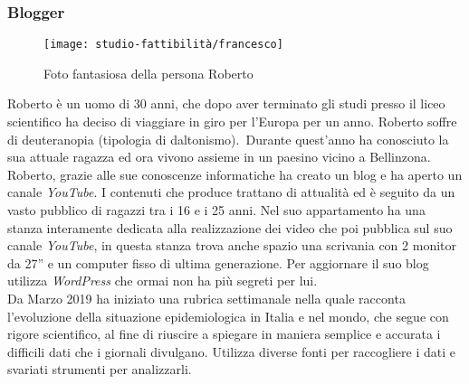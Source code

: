 \subsubsection{Blogger}
\label{sss:blogger}
\begin{wrapfigure}{l}{7cm}
	\centering
	\vspace{-13pt}
    \texttt{[image: studio-fattibilità/francesco]}
    \caption{Foto fantasiosa della persona Roberto}
    \vspace{-13pt}
\end{wrapfigure}
Roberto è un uomo di 30 anni, che dopo aver terminato gli studi presso il liceo scientifico ha deciso di viaggiare in giro per l'Europa per un anno. Roberto soffre di deuteranopia (tipologia di daltonismo). Durante quest'anno ha conosciuto la sua attuale ragazza ed ora vivono assieme in un paesino vicino a Bellinzona. Roberto, grazie alle sue conoscenze informatiche ha creato un blog e ha aperto un canale \textit{YouTube}. I contenuti che produce trattano di attualità ed è seguito da un vasto pubblico di ragazzi tra i 16 e i 25 anni. Nel suo appartamento ha una stanza interamente dedicata alla realizzazione dei video che poi pubblica sul suo canale \textit{YouTube}, in questa stanza trova anche spazio una scrivania con 2 monitor da 27'' e un computer fisso di ultima generazione. Per aggiornare il suo blog utilizza \textit{WordPress} che ormai non ha più segreti per lui.\\ 
Da Marzo 2019 ha iniziato una rubrica settimanale nella quale racconta l'evoluzione della situazione epidemiologica in Italia e nel mondo, che segue con rigore scientifico, al fine di riuscire a spiegare in maniera semplice e accurata i difficili dati che i giornali divulgano. Utilizza diverse fonti per raccogliere i dati e svariati strumenti per analizzarli. 
